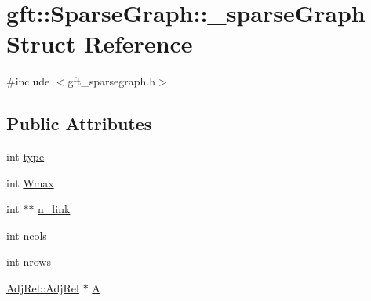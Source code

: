 \hypertarget{structgft_1_1SparseGraph_1_1__sparseGraph}{\section{gft\-:\-:Sparse\-Graph\-:\-:\-\_\-sparse\-Graph Struct Reference}
\label{structgft_1_1SparseGraph_1_1__sparseGraph}
}


{\ttfamily \#include $<$gft\-\_\-sparsegraph.\-h$>$}

\subsection*{Public Attributes}
\begin{DoxyCompactItemize}
\item 
int \hyperlink{structgft_1_1SparseGraph_1_1__sparseGraph_ad8ec377c188a20bceeee51b0f518532b}{type}
\item 
int \hyperlink{structgft_1_1SparseGraph_1_1__sparseGraph_a0b02d8b7403d6218c12576f7944e62dc}{Wmax}
\item 
int $\ast$$\ast$ \hyperlink{structgft_1_1SparseGraph_1_1__sparseGraph_a962002ccb481500e1e929d4623d16672}{n\-\_\-link}
\item 
int \hyperlink{structgft_1_1SparseGraph_1_1__sparseGraph_a31e98241f909b18997fcc0f87816b699}{ncols}
\item 
int \hyperlink{structgft_1_1SparseGraph_1_1__sparseGraph_aa1d0afb80bf110abe5f8d5d2aa311b4e}{nrows}
\item 
\hyperlink{namespacegft_1_1AdjRel_a832ff5521af7a9801ff18dc3ae629b68}{Adj\-Rel\-::\-Adj\-Rel} $\ast$ \hyperlink{structgft_1_1SparseGraph_1_1__sparseGraph_a9c521489b88258b53179bf600a5c9cd6}{A}
\end{DoxyCompactItemize}


